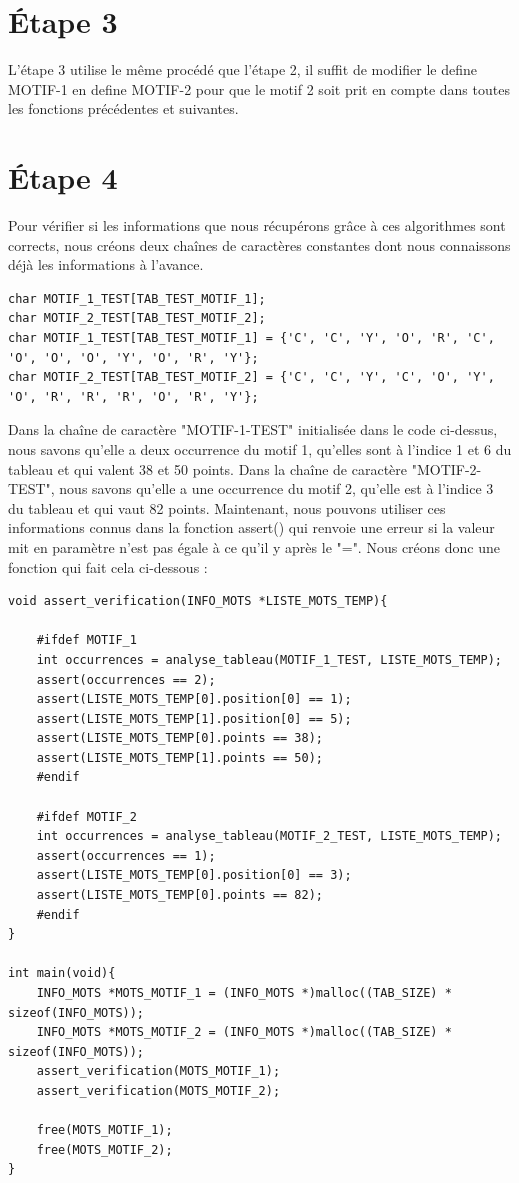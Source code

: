 \documentclass{article}
\begin{document}
\section*{Étape 3}
L'étape 3 utilise le même procédé que l'étape 2, il suffit de modifier le define MOTIF-1 en define MOTIF-2 pour que le motif 2 soit prit en compte dans toutes les fonctions précédentes et suivantes.

\section*{Étape 4}
Pour vérifier si les informations que nous récupérons grâce à ces algorithmes sont corrects, nous créons deux chaînes de caractères constantes dont nous connaissons déjà les informations à l'avance.

\begin{lstlisting}[style=Cstyle]
char MOTIF_1_TEST[TAB_TEST_MOTIF_1];
char MOTIF_2_TEST[TAB_TEST_MOTIF_2];
char MOTIF_1_TEST[TAB_TEST_MOTIF_1] = {'C', 'C', 'Y', 'O', 'R', 'C', 'O', 'O', 'O', 'Y', 'O', 'R', 'Y'};
char MOTIF_2_TEST[TAB_TEST_MOTIF_2] = {'C', 'C', 'Y', 'C', 'O', 'Y', 'O', 'R', 'R', 'R', 'O', 'R', 'Y'};
\end{lstlisting}
Dans la chaîne de caractère "MOTIF-1-TEST" initialisée dans le code ci-dessus, nous savons qu'elle a deux occurrence du motif 1, qu'elles sont à l'indice 1 et 6 du tableau et qui valent 38 et 50 points.\newline
Dans la chaîne de caractère "MOTIF-2-TEST", nous savons qu'elle a une occurrence du motif 2, qu'elle est à l'indice 3 du tableau et qui vaut 82 points.\newline\newline
Maintenant, nous pouvons utiliser ces informations connus dans la fonction assert() qui renvoie une erreur si la valeur mit en paramètre n'est pas égale à ce qu'il y après le "=". Nous créons donc une fonction qui fait cela ci-dessous :\newline

\begin{lstlisting}[style=Cstyle]
void assert_verification(INFO_MOTS *LISTE_MOTS_TEMP){

    #ifdef MOTIF_1
    int occurrences = analyse_tableau(MOTIF_1_TEST, LISTE_MOTS_TEMP);
    assert(occurrences == 2);
    assert(LISTE_MOTS_TEMP[0].position[0] == 1);
    assert(LISTE_MOTS_TEMP[1].position[0] == 5);
    assert(LISTE_MOTS_TEMP[0].points == 38);
    assert(LISTE_MOTS_TEMP[1].points == 50);
    #endif

    #ifdef MOTIF_2
    int occurrences = analyse_tableau(MOTIF_2_TEST, LISTE_MOTS_TEMP);
    assert(occurrences == 1);
    assert(LISTE_MOTS_TEMP[0].position[0] == 3);
    assert(LISTE_MOTS_TEMP[0].points == 82);
    #endif
}

int main(void){
    INFO_MOTS *MOTS_MOTIF_1 = (INFO_MOTS *)malloc((TAB_SIZE) * sizeof(INFO_MOTS));
    INFO_MOTS *MOTS_MOTIF_2 = (INFO_MOTS *)malloc((TAB_SIZE) * sizeof(INFO_MOTS));
    assert_verification(MOTS_MOTIF_1);
    assert_verification(MOTS_MOTIF_2);

    free(MOTS_MOTIF_1);
    free(MOTS_MOTIF_2);
}
\end{lstlisting}
\end{document}

